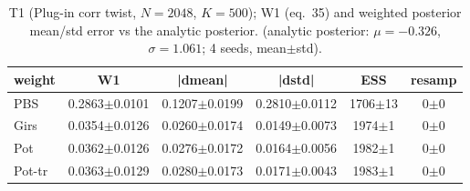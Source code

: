 \begin{table}[ht]
\centering
\caption{T1 (Plug-in corr twist, $N=2048$, $K=500$); W1 (eq.~35) and weighted posterior mean/std error vs the analytic posterior. (analytic posterior: $\mu=-0.326$, $\sigma=1.061$; 4 seeds, mean$\pm$std).}
\label{tab:toy_t1_plug_in_corrected}
\begin{tabular}{lccccc}
\toprule
weight & W1 & |dmean| & |dstd| & ESS & resamp \\
\midrule
PBS & 0.2863$\pm$0.0101 & 0.1207$\pm$0.0199 & 0.2810$\pm$0.0112 & 1706$\pm$13 & 0$\pm$0 \\
Girs & 0.0354$\pm$0.0126 & 0.0260$\pm$0.0174 & 0.0149$\pm$0.0073 & 1974$\pm$1 & 0$\pm$0 \\
Pot & 0.0362$\pm$0.0126 & 0.0276$\pm$0.0172 & 0.0164$\pm$0.0056 & 1982$\pm$1 & 0$\pm$0 \\
Pot-tr & 0.0363$\pm$0.0129 & 0.0280$\pm$0.0173 & 0.0171$\pm$0.0043 & 1983$\pm$1 & 0$\pm$0 \\
\bottomrule
\end{tabular}
\end{table}
